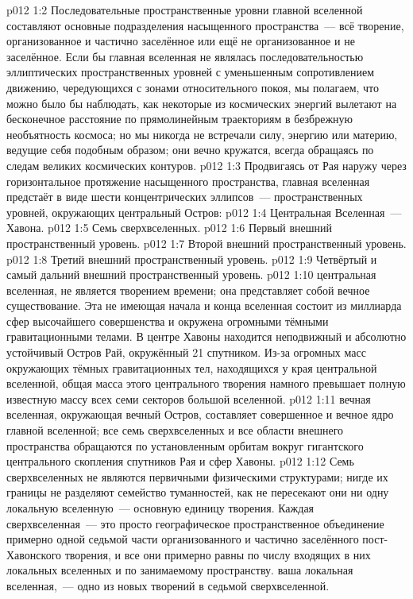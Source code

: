 \vs p012 1:2 Последовательные пространственные уровни главной вселенной составляют основные подразделения насыщенного пространства~--- всё творение, организованное и частично заселённое или ещё не организованное и не заселённое. Если бы главная вселенная не являлась последовательностью эллиптических пространственных уровней с уменьшенным сопротивлением движению, чередующихся с зонами относительного покоя, мы полагаем, что можно было бы наблюдать, как некоторые из космических энергий вылетают на бесконечное расстояние по прямолинейным траекториям в безбрежную необъятность космоса; но мы никогда не встречали силу, энергию или материю, ведущие себя подобным образом; они вечно кружатся, всегда обращаясь по следам великих космических контуров.
\vs p012 1:3 \pc Продвигаясь от Рая наружу через горизонтальное протяжение насыщенного пространства, главная вселенная предстаёт в виде шести концентрических эллипсов~--- пространственных уровней, окружающих центральный Остров:
\vs p012 1:4 Центральная Вселенная~--- Хавона.
\vs p012 1:5 Семь сверхвселенных.
\vs p012 1:6 Первый внешний пространственный уровень.
\vs p012 1:7 Второй внешний пространственный уровень.
\vs p012 1:8 Третий внешний пространственный уровень.
\vs p012 1:9 Четвёртый и самый дальний внешний пространственный уровень.
\vs p012 1:10 \pc {} центральная вселенная, не является творением времени; она представляет собой вечное существование. Эта не имеющая начала и конца вселенная состоит из миллиарда сфер высочайшего совершенства и окружена огромными тёмными гравитационными телами. В центре Хавоны находится неподвижный и абсолютно устойчивый Остров Рай, окружённый 21 спутником. Из\hyp{}за огромных масс окружающих тёмных гравитационных тел, находящихся у края центральной вселенной, общая масса этого центрального творения намного превышает полную известную массу всех семи секторов большой вселенной.
\vs p012 1:11 \pc {} вечная вселенная, окружающая вечный Остров, составляет совершенное и вечное ядро главной вселенной; все семь сверхвселенных и все области внешнего пространства обращаются по установленным орбитам вокруг гигантского центрального скопления спутников Рая и сфер Хавоны.
\vs p012 1:12 Семь сверхвселенных не являются первичными физическими структурами; нигде их границы не разделяют семейство туманностей, как не пересекают они ни одну локальную вселенную~--- основную единицу творения. Каждая сверхвселенная~--- это просто географическое пространственное объединение примерно одной седьмой части организованного и частично заселённого пост\hyp{}Хавонского творения, и все они примерно равны по числу входящих в них локальных вселенных и по занимаемому пространству.  ваша локальная вселенная,~--- одно из новых творений в  седьмой сверхвселенной.

